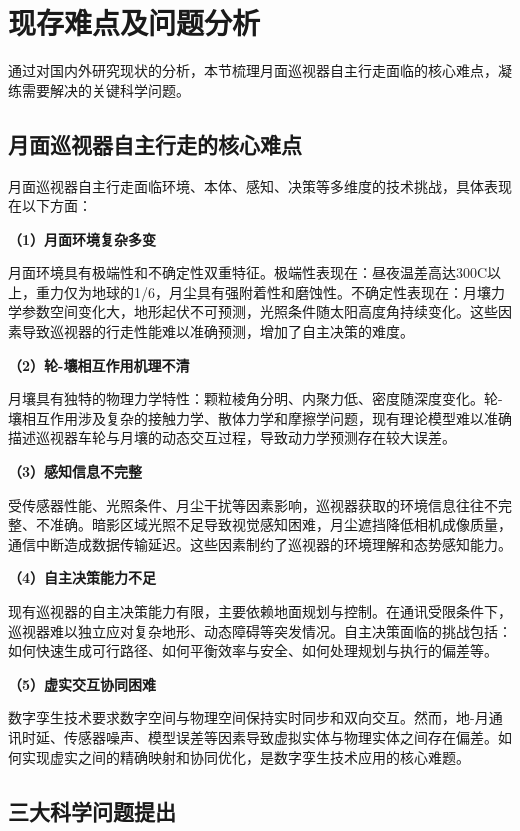 \section{现存难点及问题分析}
\label{sec:challenges}

通过对国内外研究现状的分析，本节梳理月面巡视器自主行走面临的核心难点，凝练需要解决的关键科学问题。

\subsection{月面巡视器自主行走的核心难点}
\label{subsec:core_difficulties}

月面巡视器自主行走面临环境、本体、感知、决策等多维度的技术挑战，具体表现在以下方面：

\textbf{（1）月面环境复杂多变}

月面环境具有极端性和不确定性双重特征。极端性表现在：昼夜温差高达300\degree C以上，重力仅为地球的1/6，月尘具有强附着性和磨蚀性。不确定性表现在：月壤力学参数空间变化大，地形起伏不可预测，光照条件随太阳高度角持续变化。这些因素导致巡视器的行走性能难以准确预测，增加了自主决策的难度。

\textbf{（2）轮-壤相互作用机理不清}

月壤具有独特的物理力学特性：颗粒棱角分明、内聚力低、密度随深度变化。轮-壤相互作用涉及复杂的接触力学、散体力学和摩擦学问题，现有理论模型难以准确描述巡视器车轮与月壤的动态交互过程，导致动力学预测存在较大误差。

\textbf{（3）感知信息不完整}

受传感器性能、光照条件、月尘干扰等因素影响，巡视器获取的环境信息往往不完整、不准确。暗影区域光照不足导致视觉感知困难，月尘遮挡降低相机成像质量，通信中断造成数据传输延迟。这些因素制约了巡视器的环境理解和态势感知能力。

\textbf{（4）自主决策能力不足}

现有巡视器的自主决策能力有限，主要依赖地面规划与控制。在通讯受限条件下，巡视器难以独立应对复杂地形、动态障碍等突发情况。自主决策面临的挑战包括：如何快速生成可行路径、如何平衡效率与安全、如何处理规划与执行的偏差等。

\textbf{（5）虚实交互协同困难}

数字孪生技术要求数字空间与物理空间保持实时同步和双向交互。然而，地-月通讯时延、传感器噪声、模型误差等因素导致虚拟实体与物理实体之间存在偏差。如何实现虚实之间的精确映射和协同优化，是数字孪生技术应用的核心难题。

\subsection{三大科学问题提出}
\label{subsec:scientific_problems}

